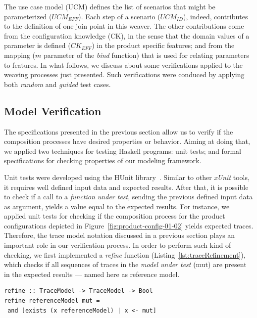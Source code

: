 \documentclass{acm_proc_article-sp}
\begin{document}
The use case model (UCM) defines the list of scenarios that might be parameterized ($UCM_{EFF}$). Each step of a scenario ($UCM_{ID}$), indeed, contributes to the definition of one join point in this weaver. The 
other contributions come from the configuration knowledge (CK), in the sense that the domain values 
of a parameter is defined ($CK_{EFF}$) in the product specific features; and from the mapping ($m$ parameter of the \emph{bind} function) that is used for relating parameters to features. 
In what follows, we discuss about some verifications applied to the weaving processes just presented. Such verifications were conduced by applying both \emph{random} and \emph{guided} test cases.

\subsection{Model Verification}\label{sub:model-verification}

The specifications presented in the 
previous section allow us to verify if the composition 
processes have desired properties or behavior. 
Aiming at doing that, we applied two techniques for testing 
Haskell programs: unit tests; and 
formal specifications for checking properties of our modeling 
framework. 

Unit tests were developed using the HUnit library~\cite{hunit-tutorial}. 
Similar to other \emph{xUnit} tools, it requires well defined input data and 
expected results. After that, it is possible to check if 
a call to a \emph{function under test}, sending the previous defined input data as 
argument, yields a value equal to the expected results. 
For instance, we applied unit tests for checking if the composition process 
for the product configurations depicted in Figure~\ref{fig:product-config-01-02} 
yields expected traces. Therefore, the trace model notation discussed in 
a previous section plays an important role in our verification process. 
In order to perform such kind of checking, we first implemented 
a \emph{refine} function (Listing~\ref{lst:traceRefinement}), 
which checks if all sequences of traces in the \emph{model under test} (mut) are 
present in the expected results --- named here as reference model. 

\begin{lstlisting}[belowskip=10pt,frame=tb,caption={The \emph{traceRefinement} function},label=lst:traceRefinement]
refine :: TraceModel -> TraceModel -> Bool
refine referenceModel mut = 
 and [exists (x referenceModel) | x <- mut]
\end{lstlisting}
\end{document}
